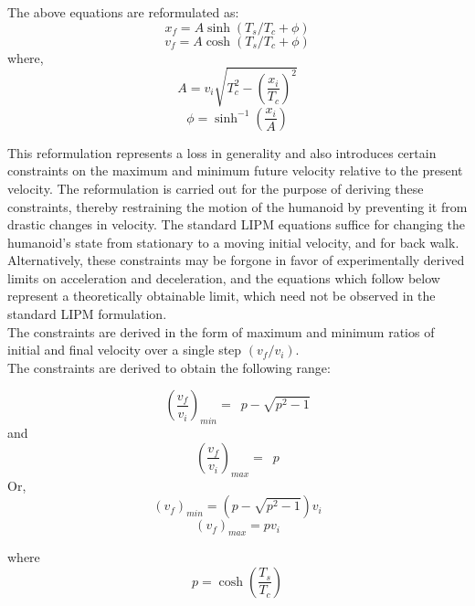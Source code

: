 \documentclass[letterpaper, 10 pt, conference]{ieeeconf}  %
\begin{document}
The above equations are reformulated as:
\begin{equation}
x_{f} = A\sinh\left(T_{s}/T_{c} + \phi\right)
\end{equation}
\begin{equation}
v_{f} = A\cosh\left(T_{s}/T_{c} + \phi\right)
\end{equation}
where,
\begin{equation}
 A=v_{i}\sqrt{T_{c}^{2}-\left(\frac{x_{i}}{T_{c}}\right)^{2}}
  \end{equation}
  \begin{equation}
  \phi=\sinh^{-1}\left(\frac{x_{i}}{A}\right)
\end{equation}

 This reformulation represents a loss in generality and also introduces
 certain constraints on the maximum and minimum future velocity relative to
 the present velocity. The reformulation is carried out for the purpose of deriving these constraints,
thereby restraining the motion of the humanoid by preventing it from drastic changes in velocity. The standard LIPM equations suffice for changing the humanoid's state from stationary to a moving
initial velocity, and for back walk. Alternatively, these constraints may be forgone in favor of experimentally derived limits on acceleration and deceleration, and the equations which follow below 
represent a theoretically obtainable limit, which need not be observed in the standard LIPM formulation.
\\
The constraints are derived in
 the form of maximum and minimum ratios of initial and final velocity over a single step $\left(v_{f}/v_{i}\right)$.\\
 The constraints are derived to obtain the following range:

 \begin{equation}
 \left(\frac{v_f}{v_i}\right)_{min} =\enspace p - \sqrt{p^2 - 1}
 \end{equation}
 and
 \begin{equation}
 \left(\frac{v_f}{v_i}\right)_{max}=\enspace p
 \end{equation}
 Or,
 \begin{equation}
(v_f)_{min}	    = \left(p - \sqrt{p^2 - 1}\right)v_i
 \end{equation}
 \begin{equation}
 (v_f)_{max}=pv_i
  \end{equation}

  where \begin{equation}
 p=\cosh\left(\frac{T_s}{T_c}\right)
 \end{equation}
 
\end{document}

